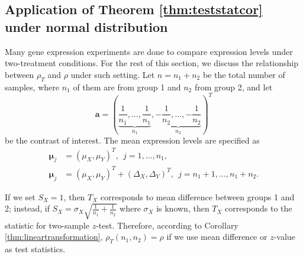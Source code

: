 \documentclass[12pt, a4paper]{article}
\begin{document}
\subsection{Application of Theorem \ref{thm:teststatcor} under normal distribution}

Many gene expression experiments are done to compare expression levels under two-treatment 
conditions. For the rest of this section, we discuss the relationship between $\rho_T$ and 
$\rho$ under such setting.
Let $n = n_1 + n_2$ be the total number of samples, where $n_1$ of them are from group 1 and 
$n_2$ from group 2, and let
\begin{equation}\label{eq:contrast}
\bm a  = (\underbrace{\frac{1}{n_1}, \ldots, \frac{1}{n_1}}_{n_1}, \underbrace{-\frac{1}{n_2}, 
	\ldots, -\frac{1}{n_2}}_{n_2})^T
\end{equation}
be the contrast of interest. 
The mean expression levels are specified as 
\begin{equation}\label{eq:meanTwogroup}
\begin{aligned}
\bm \mu_j &= (\mu_X, \mu_Y)^T,~~ j = 1, \ldots, n_1, \\
\bm \mu_j &= (\mu_X,  \mu_Y)^T  + ( \Delta_X,\Delta_Y)^T, ~~j = n_1 + 1, \ldots, n_1 + n_2.
\end{aligned}
\end{equation}


If we set $S_X=1$, then $T_X$ corresponds to mean difference between groups 1 and 2; instead, 
if $S_X = \sigma_X\sqrt{\frac{1}{n_1} + \frac{1}{n_2}}$ where $\sigma_X$ is known, then $T_X$ 
corresponds to the statistic for two-sample $z$-test. Therefore, according to Corollary 
\ref{thm:lineartransformation},  $\rho_T(n_1,n_2)=\rho$ if we use mean difference or $z$-value as 
test 
statistics.
\end{document}
